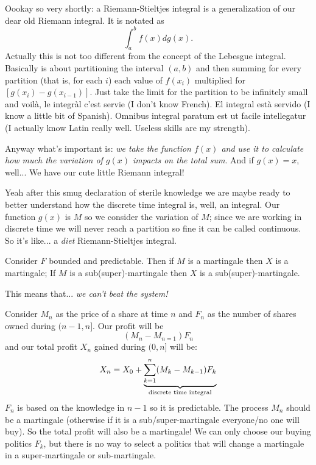 \documentclass{report}
\begin{document}
\begin{revise}
	Oookay so very shortly: a Riemann-Stieltjes integral is a generalization of our dear old Riemann integral. It is notated as
	\begin{equation*}
		\int_{a}^{b}f(x)dg(x).
	\end{equation*}
	Actually this is not too different from the concept of the Lebesgue integral. Basically is about partitioning the interval $(a,b)$ and then summing for every partition (that is, for each $i$) each value of $f(x_i)$ multiplied for $[g(x_i)-g(x_{i-1})]$. Just take the limit for the partition to be infinitely small and voilà, le integràl c'est servie (I don't know French). El integral està servido (I know a little bit of Spanish). Omnibus integral paratum est ut facile intellegatur (I actually know Latin really well. Useless skills are my strength).\par
	Anyway what's important is: \textit{we take the function $f(x)$ and use it to calculate how much the variation of $g(x)$ impacts on the total sum}. And if $g(x)=x$, well... We have our cute little Riemann integral!
\end{revise}
Yeah after this smug declaration of sterile knowledge we are maybe ready to better understand how the discrete time integral is, well, an integral. Our function $g(x)$ is $M$ so we consider the variation of $M$; since we are working in discrete time we will never reach a partition so fine it can be called continuous. So it's like... a \textit{diet} Riemann-Stieltjes integral.
\begin{theorem}
	Consider $F$ bounded and predictable. Then if $M$ is a martingale then $X$ is a martingale; If $M$ is a sub(super)-martingale then $X$ is a sub(super)-martingale.
\end{theorem}
This means that... \emph{we can't beat the system!}
	\begin{flushright}
	\hspace*{2.5cm}
\end{flushright}
\begin{example}
	Consider $M_{n}$ as the price of a share at time $n$ and $F_{n}$ as the number of shares owned during $(n-1,n]$. Our profit will be 
	\[(M_{n}-M_{n=1})F_{n}\]
	and our total profit $X_{n}$ gained during $(0,n]$ will be:
	\[X_{n}=X_{0}+\underbrace{\sum_{k=1}^{n}(M_{k}-M_{k-1})F_{k}}_{\mathclap{\text{discrete time integral}}}\]
	$F_{n}$ is based on the knowledge in $n-1$ so it is predictable. The process $M_{n}$ should be a martingale (otherwise if it is a sub/super-martingale everyone/no one will buy). So the total profit will also be a martingale! We can only choose our buying politics $F_{k}$, but there is no way to select a politics that will change a martingale in a super-martingale or sub-martingale.
\end{example}
\end{document}
